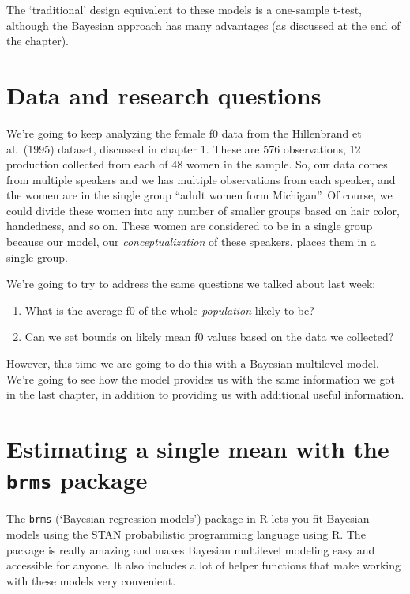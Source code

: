 \documentclass[
]{book}
\begin{document}
The `traditional' design equivalent to these models is a one-sample t-test, although the Bayesian approach has many advantages (as discussed at the end of the chapter).

\hypertarget{data-and-research-questions-1}{%
\section{Data and research questions}\label{data-and-research-questions-1}}

We're going to keep analyzing the female f0 data from the Hillenbrand et al.~(1995) dataset, discussed in chapter 1. These are 576 observations, 12 production collected from each of 48 women in the sample. So, our data comes from multiple speakers and we has multiple observations from each speaker, and the women are in the single group ``adult women form Michigan''. Of course, we could divide these women into any number of smaller groups based on hair color, handedness, and so on. These women are considered to be in a single group because our model, our \emph{conceptualization} of these speakers, places them in a single group.

We're going to try to address the same questions we talked about last week:

\begin{enumerate}
\def\labelenumi{\arabic{enumi})}
\item
  What is the average f0 of the whole \emph{population} likely to be?
\item
  Can we set bounds on likely mean f0 values based on the data we collected?
\end{enumerate}

However, this time we are going to do this with a Bayesian multilevel model. We're going to see how the model provides us with the same information we got in the last chapter, in addition to providing us with additional useful information.

\hypertarget{estimating-a-single-mean-with-the-brms-package}{%
\section{\texorpdfstring{Estimating a single mean with the \texttt{brms} package}{Estimating a single mean with the brms package}}\label{estimating-a-single-mean-with-the-brms-package}}

The \texttt{brms} \href{https://github.com/paul-buerkner/brms}{(`Bayesian regression models')} package in R lets you fit Bayesian models using the STAN probabilistic programming language using R. The package is really amazing and makes Bayesian multilevel modeling easy and accessible for anyone. It also includes a lot of helper functions that make working with these models very convenient.
\end{document}
